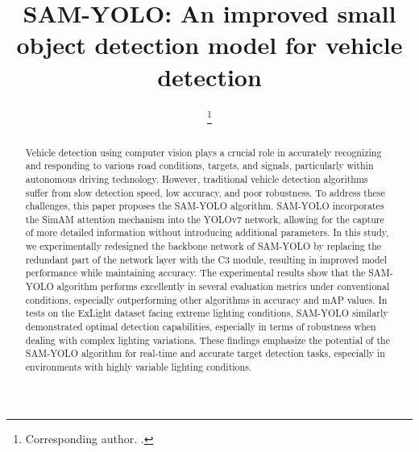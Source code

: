 \documentclass[aic]{iosart2x}
\begin{document}
\begin{frontmatter}

\title{SAM-YOLO: An improved small object detection model for vehicle detection}


\begin{aug}
\author[A]{ }
\author[A]{ }
\author[A]{ }
\author[A]{ %
\thanks{Corresponding author. .}}
\address[A]{School of Computer Engineering, ,
296 Longzhong Road, Xiangyang, 441053, Hubei, }
\end{aug}

\begin{abstract}
 Vehicle detection using computer vision plays a crucial role in accurately recognizing and responding to various road conditions, targets, and signals, particularly within autonomous driving technology. However, traditional vehicle detection algorithms suffer from slow detection speed, low accuracy, and poor robustness. To address these challenges, this paper proposes the SAM-YOLO algorithm. SAM-YOLO incorporates the SimAM attention mechanism into the YOLOv7 network, allowing for the capture of more detailed information without introducing additional parameters. In this study, we experimentally redesigned the backbone network of SAM-YOLO by replacing the redundant part of the network layer with the C3 module, resulting in improved model performance while maintaining accuracy. The experimental results show that the SAM-YOLO algorithm performs excellently in several evaluation metrics under conventional conditions, especially outperforming other algorithms in accuracy and mAP values. In tests on the ExLight dataset facing extreme lighting conditions, SAM-YOLO similarly demonstrated optimal detection capabilities, especially in terms of robustness when dealing with complex lighting variations. These findings emphasize the potential of the SAM-YOLO algorithm for real-time and accurate target detection tasks, especially in environments with highly variable lighting conditions.
\end{abstract}

\begin{keyword}
\end{keyword}

\end{frontmatter}
\end{document}
